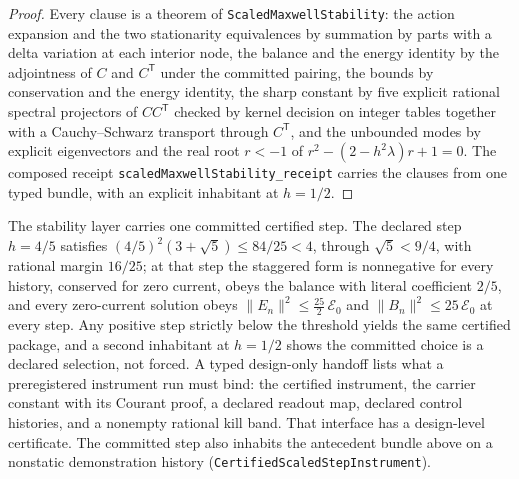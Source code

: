 \documentclass[11pt]{article}
\theoremstyle{remark}
\theoremstyle{plain}
\begin{document}
\begin{proof}
Every clause is a theorem of \texttt{ScaledMaxwellStability}: the action
expansion and the two stationarity equivalences by summation by parts with a
delta variation at each interior node, the balance and the energy identity by
the adjointness of \(C\) and \(C^{\mathsf T}\) under the committed pairing, the
bounds by conservation and the energy identity, the sharp constant by five
explicit rational spectral projectors of \(CC^{\mathsf T}\) checked by kernel
decision on integer tables together with a Cauchy--Schwarz transport through
\(C^{\mathsf T}\), and the unbounded modes by explicit eigenvectors and the
real root \(r<-1\) of \(r^2-(2-h^2\lambda)r+1=0\). The composed receipt
\texttt{scaledMaxwellStability\_receipt} carries the clauses from one typed
bundle, with an explicit inhabitant at \(h=1/2\).
\end{proof}

The stability layer carries one committed certified step. The declared step
\(h=4/5\) satisfies \((4/5)^2(3+\sqrt5)\le 84/25<4\), through
\(\sqrt5<9/4\), with rational margin \(16/25\); at that step the staggered
form is nonnegative for every history, conserved for zero current, obeys
the balance with literal coefficient \(2/5\), and every zero-current
solution obeys \(\lVert E_n\rVert^2\le\tfrac{25}2\,\mathcal E_0\) and
\(\lVert B_n\rVert^2\le 25\,\mathcal E_0\) at every step. Any positive step
strictly below the threshold yields the same certified package, and a
second inhabitant at \(h=1/2\) shows the committed choice is a declared
selection, not forced. A typed design-only handoff lists what a
preregistered instrument run must bind: the certified instrument, the
carrier constant with its Courant proof, a declared readout map, declared
control histories, and a nonempty rational kill band. That interface has a design-level certificate. The committed step also
inhabits the antecedent bundle above on a nonstatic demonstration history
(\texttt{CertifiedScaledStepInstrument}).
\end{document}
